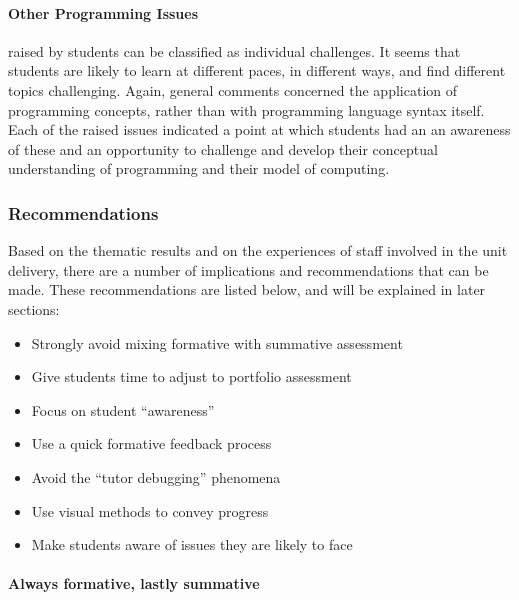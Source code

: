 
\paragraph{Other Programming Issues} %
\label{ssub:other_programming_issues}

raised by students can be classified as individual challenges. It seems that students are likely to learn at different paces, in different ways, and find different topics challenging. Again, general comments concerned the application of programming concepts, rather than with programming language syntax itself. Each of the raised issues indicated a point at which students had an an awareness of these and an opportunity to challenge and develop their conceptual understanding of programming and their model of computing. 


\subsubsection{Recommendations}
 
Based on the thematic results and on the experiences of staff involved in the unit delivery, there are a number of implications and recommendations that can be made. These recommendations are listed below, and will be explained in later sections:

\begin{itemize}[noitemsep,nolistsep]
	\item Strongly avoid mixing formative with summative assessment
	\item Give students time to adjust to portfolio assessment
	\item Focus on student ``awareness''
	\item Use a quick formative feedback process
	\item Avoid the ``tutor debugging'' phenomena
	\item Use visual methods to convey progress
	\item Make students aware of issues they are likely to face
\end{itemize}

\paragraph{Always formative, lastly summative}

